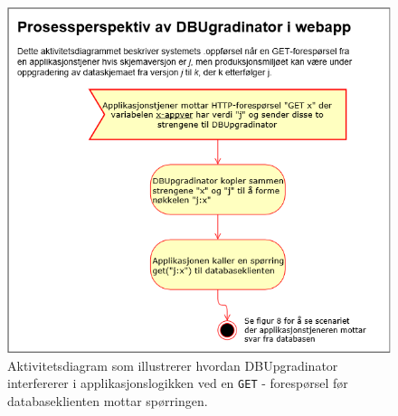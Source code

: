 \begin{figure}[!ht]
    \centering
    \includegraphics[scale=0.6]{fig/dbupgradinator-prosess-1.png}
    \caption{Aktivitetsdiagram som illustrerer hvordan DBUpgradinator interfererer i applikasjonslogikken ved en \texttt{GET} - forespørsel før databaseklienten mottar spørringen.}
    \label{fig7}
\end{figure}

\newpage

